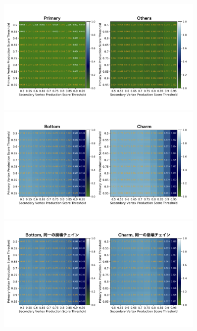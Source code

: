 \begin{figure}[htbp]
 \centering
  \begin{minipage}{0.95\textwidth}
   \centering
    \includegraphics[trim = 0 140 0 125, width=0.9\textwidth, clip]{Figure/4VertexFinderwithDL/4-2-2-2PrimaryOthers.png}
   \end{minipage}
   
   \begin{minipage}{0.95\textwidth}
   \centering
    \includegraphics[trim = 0 140 0 125, width=0.9\textwidth, clip]{Figure/4VertexFinderwithDL/4-2-2-2BottomCharm.png}
   \end{minipage}
   
   \begin{minipage}{0.95\textwidth}
   \centering
    \includegraphics[trim = 0 140 0 125, width=0.9\textwidth, clip]{Figure/4VertexFinderwithDL/4-2-2-2SameDecayChain.png}
   \end{minipage}
   

\end{figure}
